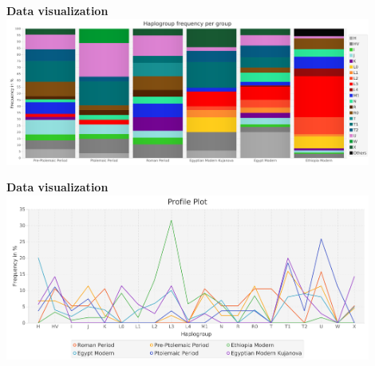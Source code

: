 \documentclass[a0paper,portrait, fontscale=0.285]{baposter}
\begin{document}
\begin{poster}
{\vspace{1em}

\begin{minipage}[t]{0.5\textwidth}
\textbf{Data visualization}\\
		\includegraphics[width=0.9\textwidth, left]{figures/stackedBarchart.png}
\end{minipage}
\hspace{0.5em}
\begin{minipage}[t]{0.5\textwidth}
\textbf{Data visualization}\\
		\includegraphics[width=0.9\textwidth, left]{figures/profile.png}
\end{minipage}

}




\end{poster}
\end{document}
